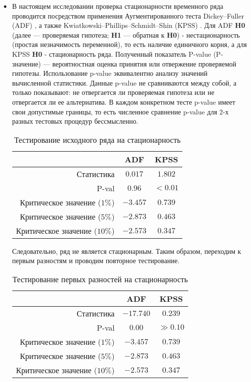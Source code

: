 	\begin{itemize}
		\item В настоящем исследовании проверка стационарности временного ряда проводится посредством применения Аугментированного теста Dickey–Fuller (ADF) \cite{adf_unit_root_test}, а также Kwiatkowski–Phillips–Schmidt–Shin (KPSS) \cite{kpss_unit_root_test}. Для ADF \textbf{H0} (далее --- проверяемая гипотеза; \textbf{H1} --- обратная к \textbf{H0}) - нестационарность (простая незначимость переменной), то есть наличие единичного корня, а для KPSS \textbf{H0} - стационарность ряда. Полученный показатель P-value (P-значение) --- вероятностная оценка принятия или отвержение проверяемой гипотезы. Использование p-value эквивалентно анализу значений вычисленной статистики. Данные p-value не сравниваются между собой, а только показывают: не отвергается ли проверяемая гипотеза или не отвергается ли ее альтернатива. В каждом конкретном тесте p-value имеет свои допустимые границы, то есть численное сравнение p-value для 2-х разных тестовых процедур бессмысленно.
		\begin{table}[H]
			\centering
			\begin{tabular}{r|cc}
				\toprule
				& ADF & KPSS\\
				\midrule[0.02cm]
				Статистика & $0.017$ & $1.802$\\
				P-val & $0.96$ & $< 0.01$\\
				Критическое значение ($1\%$) & $-3.457$ & $0.739$\\
				Критическое значение ($5\%$) & $-2.873$ & $0.463$\\
				Критическое значение ($10\%$) & $-2.573$ & $0.347$\\
				\midrule[0.02cm]
			\end{tabular}
			\caption{Тестирование исходного ряда на стационарность}
		\end{table}
		Следовательно, ряд не является стационарным. Таким образом, переходим к первым разностям и проводим повторное тестирование.
		\begin{table}[H]
			\centering
			\begin{tabular}{r|cc}
				\toprule
				& ADF & KPSS\\
				\midrule[0.02cm]
				Статистика & $-17.740$ & $0.239$\\
				P-val & $0.00$ & $\gg 0.10$\\
				Критическое значение ($1\%$) & $-3.457$ & $0.739$\\
				Критическое значение ($5\%$) & $-2.873$ & $0.463$\\
				Критическое значение ($10\%$) & $-2.573$ & $0.347$\\
				\midrule[0.02cm]
			\end{tabular}
			\caption{Тестирование первых разностей на стационарность}
		\end{table}
	

\end{itemize}
